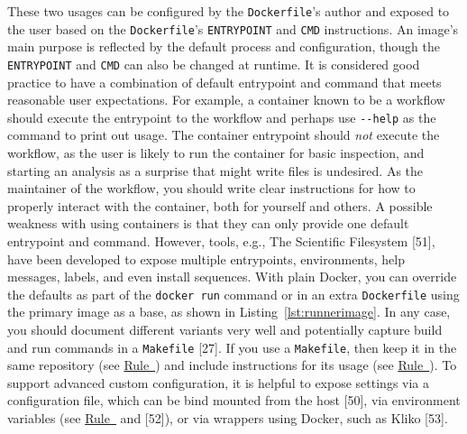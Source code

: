 \documentclass[10pt,letterpaper]{article}
\begin{document}
These two usages can be configured by the \texttt{Dockerfile}'s author
and exposed to the user based on the \texttt{Dockerfile}'s
\texttt{ENTRYPOINT} and \texttt{CMD} instructions. An image's main
purpose is reflected by the default process and configuration, though
the \texttt{ENTRYPOINT} and \texttt{CMD} can also be changed at runtime.
It is considered good practice to have a combination of default
entrypoint and command that meets reasonable user expectations. For
example, a container known to be a workflow should execute the
entrypoint to the workflow and perhaps use \texttt{-\/-help} as the
command to print out usage. The container entrypoint should \emph{not}
execute the workflow, as the user is likely to run the container for
basic inspection, and starting an analysis as a surprise that might
write files is undesired. As the maintainer of the workflow, you should
write clear instructions for how to properly interact with the
container, both for yourself and others. A possible weakness with using
containers is that they can only provide one default entrypoint and
command. However, tools, e.g., The Scientific Filesystem {[}51{]}, have
been developed to expose multiple entrypoints, environments, help
messages, labels, and even install sequences. With plain Docker, you can
override the defaults as part of the \texttt{docker\ run} command or in
an extra \texttt{Dockerfile} using the primary image as a base, as shown
in Listing~\ref{lst:runnerimage}. In any case, you should document
different variants very well and potentially capture build and run
commands in a \texttt{Makefile} {[}27{]}. If you use a
\texttt{Makefile}, then keep it in the same repository (see
\hyperref[{rule:mount}]{Rule~}) and include
instructions for its usage (see
\hyperref[{rule:document}]{Rule~}). To support
advanced custom configuration, it is helpful to expose settings via a
configuration file, which can be bind mounted from the host {[}50{]},
via environment variables (see
\hyperref[{rule:pinning}]{Rule~} and {[}52{]}),
or via wrappers using Docker, such as Kliko {[}53{]}.

\scriptsize
\end{document}
